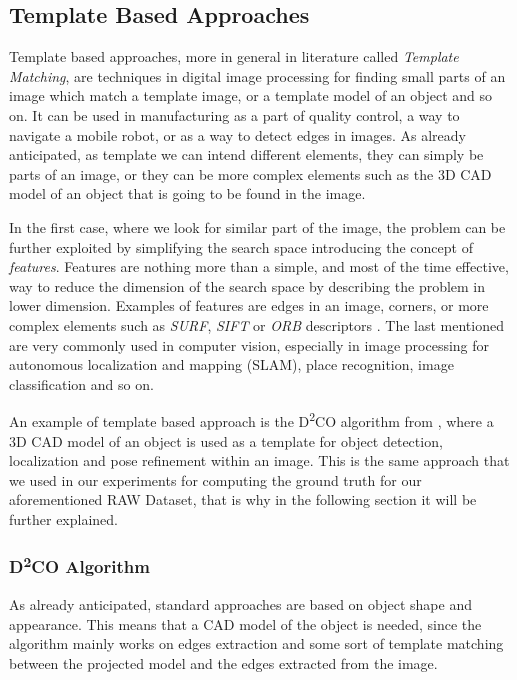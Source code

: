 \subsection{Template Based Approaches}\label{subsec:template_matching}
Template based approaches, more in general in literature called \emph{Template Matching}, are techniques in digital image processing for finding small parts of an image which match a template image, or a template model of an object and so on. It can be used in manufacturing as a part of quality control, a way to navigate a mobile robot, or as a way to detect edges in images. As already anticipated, as template we can intend different elements, they can simply be parts of an image, or they can be more complex elements such as the 3D CAD model of an object that is going to be found in the image. 

In the first case, where we look for similar part of the image, the problem can be further exploited by simplifying the search space introducing the concept of \emph{features}. Features are nothing more than a simple, and most of the time effective, way to reduce the dimension of the search space by describing the problem in lower dimension. Examples of features are edges in an image, corners, or more complex elements such as \emph{SURF}, \emph{SIFT} or \emph{ORB} descriptors \cite{karami2017image}. The last mentioned are very commonly used in computer vision, especially in image processing for autonomous localization and mapping (SLAM), place recognition, image classification and so on.

An example of template based approach is the D\textsuperscript{2}{CO} algorithm from \cite{imperoli2015d2co}, where a 3D CAD model of an object is used as a template for object detection, localization and pose refinement within an image. This is the same approach that we used in our experiments for computing the ground truth for our aforementioned RAW Dataset, that is why in the following section it will be further explained.

\subsubsection{D\textsuperscript{2}{CO} Algorithm}\label{subsec:d2co}
As already anticipated, standard approaches are based on object shape and appearance. This means that a CAD model of the object is needed, since the algorithm mainly works on edges extraction and some sort of template matching between the projected model and the edges extracted from the image.

